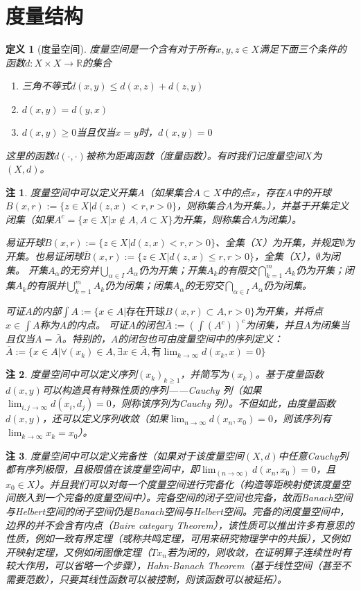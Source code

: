 \documentclass{article}                     %
\numberwithin{equation}{section}            %
\numberwithin{figure}{section}              %
\numberwithin{table}{section}               %
\newtheorem{definition}{\indent 定义}[section]
\newtheorem{remark}{\indent 注}[section]
\begin{document}
\section{度量结构}
\begin{definition}[度量空间]
    度量空间是一个含有对于所有$x,y,z\in X$满足下面三个条件的函数$d:X\times X\to \mathbb{R} $的集合
    \begin{enumerate}
        \item 三角不等式$d(x,y)\le d(x,z)+d(z,y)$
        \item $d(x,y)=d(y,x)$
        \item $d(x,y)\ge 0$当且仅当$x=y$时，$d(x,y)=0$
    \end{enumerate}
    这里的函数$d(\cdot,\cdot)$被称为距离函数（度量函数）。有时我们记度量空间$X$为$(X,d)$。
\end{definition}
\begin{remark}
    度量空间中可以定义开集$A$（如果集合$A\subset X$中的点$x$，存在$A$中的开球$B(x,r):=\{z\in X|d(z,x)<r,r>0\}$，则称集合$A$为开集。），并基于开集定义闭集（如果$A^c=\{x\in X|x\notin A,A\subset X\}$为开集，则称集合$A$为闭集）。
    
    易证开球$B(x,r):=\{z\in X|d(z,x)<r,r>0\}$、全集（$X$）为开集，并规定$\emptyset $为开集。也易证闭球$\bar{B}(x,r):=\{z\in X|d(z,x)\le r,r>0\}$，全集（$X$），$\emptyset $为闭集。
    开集$A_\alpha $的无穷并$\bigcup _{\alpha \in I}A_{\alpha }$仍为开集；开集$A_k $的有限交$\bigcap _{k=1}^{m}A_{k}$仍为开集；闭集$A_k $的有限并$\bigcup _{k=1}^{m}A_{k}$仍为闭集；闭集$A_\alpha $的无穷交$\bigcap _{\alpha \in I}A_{\alpha }$仍为闭集。
    
    可证$A$的内部$\int{A}:=\{x\in A|\mbox{存在开球}B(x,r)\subset A,r>0\}$为开集，并将点$x\in \int{A}$称为$A$的内点。
    可证$A$的闭包$\bar{A}:=(\int{(A^c)})^c$为闭集，并且$A$为闭集当且仅当$A=\bar{A}$。特别的，$A$的闭包也可由度量空间中的序列定义：$\bar{A}:=\{x\in A|\forall  (x_k)\in A ,\exists x\in \bar{A},\mbox{有}\lim_{k\to \infty}d(x_k,x)=0\}$
\end{remark}
\begin{remark}
    度量空间中可以定义序列$(x_k)_{k\ge 1}$，并简写为$(x_k)$。基于度量函数$d(x,y)$可以构造具有特殊性质的序列——Cauchy 列（如果$\lim_{i,j\to \infty}d(x_i,d_j)=0$，则称该序列为Cauchy 列）。不但如此，由度量函数$d(x,y)$，还可以定义序列收敛（如果$\lim_{n\to \infty}d(x_n,x_0)=0$，则该序列有$\lim_{k\to \infty}x_k=x_0$）。
\end{remark}
\begin{remark}
    度量空间中可以定义完备性（如果对于该度量空间$(X,d)$中任意Cauchy列都有序列极限，且极限值在该度量空间中，即$\lim_{(n\to \infty)}d(x_n,x_0)=0$，且$x_0\in X$）。并且我们可以对每一个度量空间进行完备化（构造等距映射使该度量空间嵌入到一个完备的度量空间中）。完备空间的闭子空间也完备，故而Banach空间与Helbert空间的闭子空间仍是Banach空间与Helbert空间。完备的闭度量空间中，边界的并不会含有内点（Baire categary Theorem），该性质可以推出许多有意思的性质，例如一致有界定理（或称共鸣定理，可用来研究物理学中的共振），又例如开映射定理，又例如闭图像定理（$Tx_n$若为闭的，则收敛，在证明算子连续性时有较大作用，可以省略一个步骤），Hahn-Banach Theorem（基于线性空间（甚至不需要范数），只要其线性函数可以被控制，则该函数可以被延拓）。
\end{remark}
\end{document}
